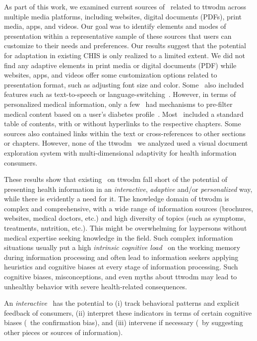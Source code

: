 As part of this work, we examined current sources of \chis\ related to \acrshort{ttwodm} across multiple media platforms, including websites, digital documents (PDFs), print media, apps, and videos. Our goal was to identify elements and modes of presentation within a representative sample of these sources that users can customize to their needs and preferences.
%
Our results suggest that the potential for adaptation in existing CHIS is only realized to a limited extent.
%
We did not find any adaptive elements in print media or digital documents (PDF) while websites, apps, and videos offer some customization options related to presentation format, such as adjusting font size and color. 
%
Some \chis\ also included features such as text-to-speech or language-switching~\cite{RN7, RN8}.
%
However, in terms of personalized medical information, only a few \chis\ had mechanisms to pre-filter medical content based on a user's diabetes profile~\cite{RN9}.
%
Most \chis\ included a standard table of contents, with or without hyperlinks to the respective chapters. Some sources also contained links within the text or cross-references to other sections or chapters. 
%
However, none of the \acrshort{ttwodm} \chis\ we analyzed used a visual document exploration system with multi-dimensional adaptivity for health information consumers.



These results show that existing \chis\ on \acrshort{ttwodm} fall short of the potential of presenting health information in an \emph{interactive}, \emph{adaptive} and/or \emph{personalized} way, while there is evidently a need for it. 
%
The knowledge domain of \acrshort{ttwodm} is complex and comprehensive, with a wide range of information sources (brochures, websites, medical doctors, etc.) and high diversity of topics (such as symptoms, treatments, nutrition, etc.). 
%
This might be overwhelming for laypersons without medical expertise seeking knowledge in the field. Such complex information situations usually put a high \emph{intrinsic cognitive load}~\cite{sweller2005implications} on the working memory during information processing and often lead to information seekers applying heuristics and cognitive biases at every stage of information processing. 
%
Such cognitive biases, misconceptions, and even myths about \acrshort{ttwodm} may lead to unhealthy behavior with severe health-related consequences. 


An \emph{interactive} \chis\ has the potential to (i) track behavioral patterns and explicit feedback of consumers, (ii) interpret these indicators in terms of certain cognitive biases (\eg\ the confirmation bias), and (iii) intervene if necessary (\eg\ by suggesting other pieces or sources of information). 

